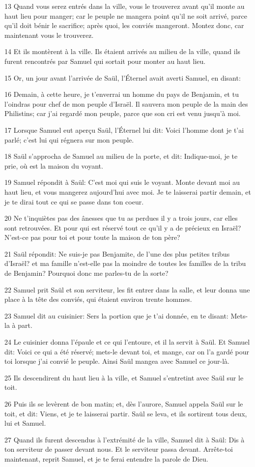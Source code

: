 \par 13 Quand vous serez entrés dans la ville, vous le trouverez avant qu'il monte au haut lieu pour manger; car le peuple ne mangera point qu'il ne soit arrivé, parce qu'il doit bénir le sacrifice; après quoi, les conviés mangeront. Montez donc, car maintenant vous le trouverez.
\par 14 Et ils montèrent à la ville. Ils étaient arrivés au milieu de la ville, quand ils furent rencontrés par Samuel qui sortait pour monter au haut lieu.
\par 15 Or, un jour avant l'arrivée de Saül, l'Éternel avait averti Samuel, en disant:
\par 16 Demain, à cette heure, je t'enverrai un homme du pays de Benjamin, et tu l'oindras pour chef de mon peuple d'Israël. Il sauvera mon peuple de la main des Philistins; car j'ai regardé mon peuple, parce que son cri est venu jusqu'à moi.
\par 17 Lorsque Samuel eut aperçu Saül, l'Éternel lui dit: Voici l'homme dont je t'ai parlé; c'est lui qui régnera sur mon peuple.
\par 18 Saül s'approcha de Samuel au milieu de la porte, et dit: Indique-moi, je te prie, où est la maison du voyant.
\par 19 Samuel répondit à Saül: C'est moi qui suis le voyant. Monte devant moi au haut lieu, et vous mangerez aujourd'hui avec moi. Je te laisserai partir demain, et je te dirai tout ce qui se passe dans ton coeur.
\par 20 Ne t'inquiètes pas des ânesses que tu as perdues il y a trois jours, car elles sont retrouvées. Et pour qui est réservé tout ce qu'il y a de précieux en Israël? N'est-ce pas pour toi et pour toute la maison de ton père?
\par 21 Saül répondit: Ne suis-je pas Benjamite, de l'une des plus petites tribus d'Israël? et ma famille n'est-elle pas la moindre de toutes les familles de la tribu de Benjamin? Pourquoi donc me parles-tu de la sorte?
\par 22 Samuel prit Saül et son serviteur, les fit entrer dans la salle, et leur donna une place à la tête des conviés, qui étaient environ trente hommes.
\par 23 Samuel dit au cuisinier: Sers la portion que je t'ai donnée, en te disant: Mets-la à part.
\par 24 Le cuisinier donna l'épaule et ce qui l'entoure, et il la servit à Saül. Et Samuel dit: Voici ce qui a été réservé; mets-le devant toi, et mange, car on l'a gardé pour toi lorsque j'ai convié le peuple. Ainsi Saül mangea avec Samuel ce jour-là.
\par 25 Ils descendirent du haut lieu à la ville, et Samuel s'entretint avec Saül sur le toit.
\par 26 Puis ils se levèrent de bon matin; et, dès l'aurore, Samuel appela Saül sur le toit, et dit: Viens, et je te laisserai partir. Saül se leva, et ils sortirent tous deux, lui et Samuel.
\par 27 Quand ils furent descendus à l'extrémité de la ville, Samuel dit à Saül: Dis à ton serviteur de passer devant nous. Et le serviteur passa devant. Arrête-toi maintenant, reprit Samuel, et je te ferai entendre la parole de Dieu.

